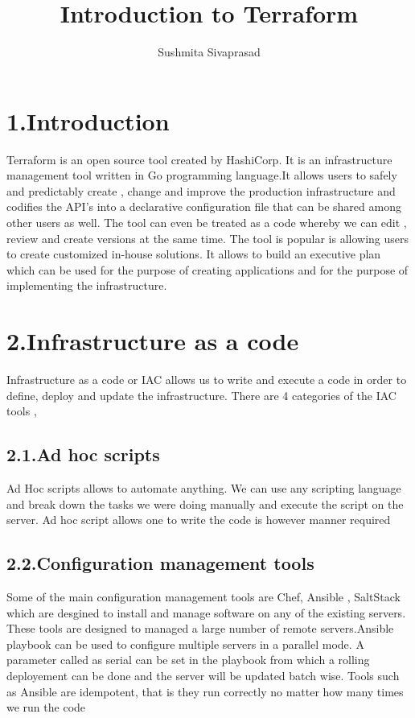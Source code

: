 \documentclass[9pt,twocolumn,twoside]{../../styles/osajnl}
\title{Introduction to Terraform}
\author[1]{Sushmita Sivaprasad}
\affil[1]{School of Informatics and Computing, Bloomington, IN 47408, U.S.A.}
\affil[*]{Corresponding authors: sushsiva@umail.iu.edu}
\begin{document}
\maketitle

\section{1.Introduction}

Terraform is an open source tool created by HashiCorp. It is an
infrastructure management tool written in Go programming language.It
allows users to safely and predictably create , change and improve the
production infrastructure and codifies the API's into a declarative
configuration file that can be shared among other users as
well\cite{www-terraform}. The tool can even be treated as a code
whereby we can edit , review and create versions at the same time. The
tool is popular is allowing users to create customized in-house
solutions. It allows to build an executive plan which can be used for
the purpose of creating applications and for the purpose of
implementing the infrastructure\cite{www-terraform-book}.

\section{2.Infrastructure as a code}

Infrastructure as a code or IAC allows us to write and execute a code
in order to define, deploy and update the infrastructure. There are 4
categories of the IAC tools ,
\subsection{2.1.Ad hoc scripts}

Ad Hoc scripts allows to automate anything. We can use any scripting
language and break down the tasks we were doing manually and execute
the script on the server. Ad hoc script allows one to write the code
is however manner required\cite{www-terraform-upandrunning}

\subsection{2.2.Configuration management tools}

Some of the main configuration management tools are Chef, Ansible ,
SaltStack which are desgined to install and manage software on any of
the existing servers. These tools are designed to managed a large
number of remote servers.Ansible playbook can be used to configure
multiple servers in a parallel mode. A parameter called as serial can
be set in the playbook from which a rolling deployement can be done
and the server will be updated batch wise. Tools such as Ansible are
idempotent, that is they run correctly no matter how many times we run
the code\cite{www-terraform-upandrunning}
\end{document}

